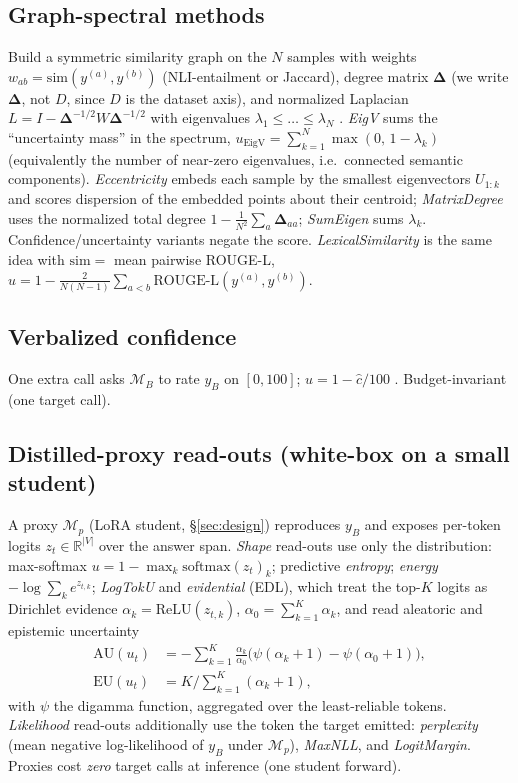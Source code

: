\documentclass[11pt]{article}
\begin{document}
\subsection{Graph-spectral methods}
Build a symmetric similarity graph on the $N$ samples with weights $w_{ab}=\mathrm{sim}
(y^{(a)},y^{(b)})$ (NLI-entailment or Jaccard), degree matrix $\mathbf{\Delta}$ (we write
$\mathbf{\Delta}$, not $D$, since $D$ is the dataset axis), and normalized Laplacian
$L = I - \mathbf{\Delta}^{-1/2} W \mathbf{\Delta}^{-1/2}$ with eigenvalues $\lambda_1\le\dots\le\lambda_N$
\citep{lin2024generating}. \emph{EigV} sums the ``uncertainty mass'' in the spectrum,
$u_{\mathrm{EigV}}=\sum_{k=1}^{N}\max(0,\,1-\lambda_k)$ (equivalently the number of
near-zero eigenvalues, i.e.\ connected semantic components). \emph{Eccentricity} embeds each
sample by the smallest eigenvectors $U_{1:k}$ and scores dispersion of the embedded points
about their centroid; \emph{MatrixDegree} uses the normalized total degree $1-\tfrac{1}{N^{2}}\sum_a \mathbf{\Delta}_{aa}$; \emph{SumEigen} sums $\lambda_k$. Confidence/uncertainty variants negate the
score. \emph{LexicalSimilarity} is the same idea with $\mathrm{sim}=$ mean pairwise ROUGE-L,
$u=1-\tfrac{2}{N(N-1)}\sum_{a<b}\mathrm{ROUGE}\text{-}\mathrm{L}(y^{(a)},y^{(b)})$.

\subsection{Verbalized confidence}
One extra call asks $\mathcal{M}_B$ to rate $y_B$ on $[0,100]$; $u=1-\hat{c}/100$
\citep{tian2023just}. Budget-invariant (one target call).

\subsection{Distilled-proxy read-outs (white-box on a small student)}
A proxy $\mathcal{M}_p$ (LoRA student, \S\ref{sec:design}) reproduces $y_B$ and exposes
per-token logits $z_t\in\mathbb{R}^{|V|}$ over the answer span. \emph{Shape} read-outs use
only the distribution: max-softmax $u=1-\max_k \mathrm{softmax}(z_t)_k$; predictive
\emph{entropy}; \emph{energy} $-\log\sum_k e^{z_{t,k}}$; \emph{LogTokU} and \emph{evidential}
(EDL), which treat the top-$K$ logits as Dirichlet evidence
$\alpha_k=\mathrm{ReLU}(z_{t,k})$, $\alpha_0=\sum_{k=1}^K\alpha_k$, and read aleatoric and
epistemic uncertainty~\citep{sensoy2018evidential,ma2025logtoku,cui2026disaad}
\begin{align}
\mathrm{AU}(u_t) &= -\sum_{k=1}^{K}\tfrac{\alpha_k}{\alpha_0}\big(\psi(\alpha_k{+}1)-\psi(\alpha_0{+}1)\big),\\
\mathrm{EU}(u_t) &= K \big/ \textstyle\sum_{k=1}^{K}(\alpha_k+1),
\end{align}
with $\psi$ the digamma function, aggregated over the least-reliable tokens. \emph{Likelihood}
read-outs additionally use the token the target emitted: \emph{perplexity} (mean negative
log-likelihood of $y_B$ under $\mathcal{M}_p$), \emph{MaxNLL}, and \emph{LogitMargin}. Proxies
cost \emph{zero} target calls at inference (one student forward).
\end{document}
